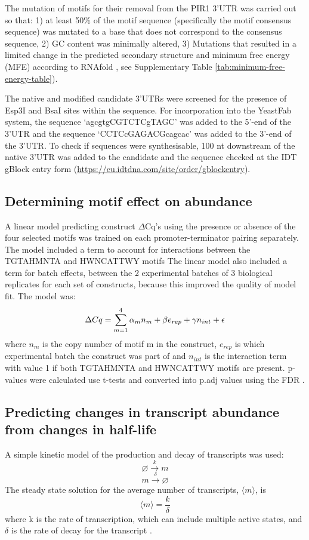 \documentclass[../main.tex]{subfiles}
\begin{document}
The mutation of motifs for their removal from the PIR1 3'UTR was carried out so that: 1) at least 50\% of the motif sequence (specifically the motif consensus sequence) was mutated to a base that does not correspond to the consensus sequence,
2) GC content was minimally altered,
3) Mutations that resulted in a limited change in the predicted secondary structure and minimum free energy (MFE) according to RNAfold \parencite{Lorenz2011}, see Supplementary Table \ref{tab:minimum-free-energy-table}).

The native and modified candidate 3'UTRs were screened for the presence of Esp3I and BsaI sites within the sequence.
For incorporation into the YeastFab system, the sequence `agcgtgCGTCTCgTAGC' was added to the 5'-end of the 3'UTR and the sequence `CCTCcGAGACGcagcac' was added to the 3'-end of the 3'UTR.
To check if sequences were synthesisable, 100 nt downstream of the native 3'UTR was added to the candidate and the sequence checked at the IDT gBlock entry form (\url{https://eu.idtdna.com/site/order/gblockentry}).

\subsection{Determining motif effect on abundance}

A linear model predicting construct \(\Delta\)Cq's using the presence or absence of the four selected motifs was trained on each promoter-terminator pairing separately.
The model included a term to account for interactions between the TGTAHMNTA and HWNCATTWY motifs
The linear model also included a term for batch effects, between the 2 experimental batches of 3 biological replicates for each set of constructs, because this improved the quality of model fit.
The model was:
\[\Delta Cq = \sum_{m=1}^4\alpha_mn_{m} + \beta \space e_{rep} + \gamma \space n_{int}+ \epsilon\]
where \(n_m\) is the copy number of motif m in the construct, \(e_{rep}\) is which experimental batch the construct was part of and \(n_{int}\) is the interaction term with value 1 if both TGTAHMNTA and HWNCATTWY motifs are present.
p-values were calculated use t-tests and converted into p.adj values using the FDR \parencite{Benjamini1995}.

\subsection{Predicting changes in transcript abundance from changes in half-life}

A simple kinetic model of the production and decay of transcripts was used:
\[\varnothing \xrightarrow{k} m\]
\[m \xrightarrow{\delta}  \varnothing\]
The steady state solution for the average number of transcripts, \(\langle m \rangle\), is
\[\langle m \rangle = \frac{k}{\delta}\]
where k is the rate of transcription, which can include multiple active states, and \(\delta\) is the rate of decay for the transcript \parencite{Sanchez2008}.
\end{document}
